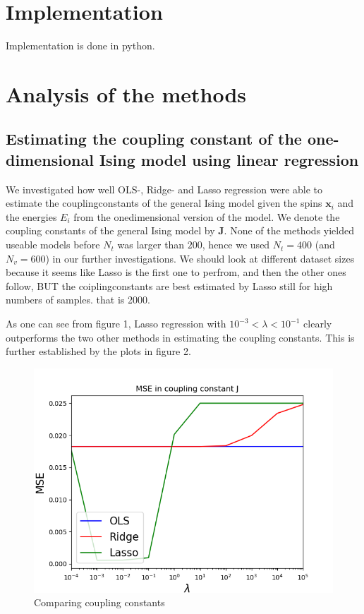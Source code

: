 \documentclass[a4paper,english]{article}
\begin{document}
\section{Implementation}
Implementation is done in python.

\section{Analysis of the methods}
\subsection{Estimating the coupling constant of the one-dimensional 
Ising model using linear regression}
We investigated how well OLS-, Ridge- and Lasso regression were able
to estimate the couplingconstants 
of the general Ising model 
given the spins $\bm{x}_i$ and the energies $E_i$ from
the onedimensional version of the model. We denote the coupling constants
of the general Ising model by $\bm{J}$.
None of the methods yielded useable models before $N_t$ was larger than
$200$, hence we used $N_t=400$ (and $N_v=600$) in our further
investigations. We should look at different dataset sizes
because it seems like Lasso is the first one to perfrom, and then 
the other ones follow, BUT the coiplingconstants are best estimated
by Lasso still for high numbers of samples. that is 2000.
\par
As one can see from figure 1, Lasso regression with 
$10^{-3} < \lambda < 10^{-1}$ clearly outperforms the two other methods
in estimating the coupling constants. This is further established
by the plots in figure 2.
\begin{figure}
    \includegraphics[scale=.7]{MSE_J_N1000_train4test6.png}
    \caption{Comparing coupling constants}
\end{figure}
\end{document}
